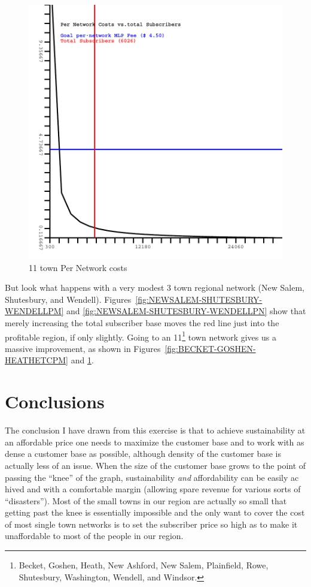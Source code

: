 \documentclass[12pt]{article}
\begin{document}
\begin{figure}[Hpbt]
\begin{centering}
\includegraphics[width=5in]{BECKET-GOSHEN-HEATH-NEW_ASHFORD-NEW_SALEM-PLAINFIELD-ROWE-SHUTESBURY-WASHINGTON-WENDELL-WINDSOR-PerNetwork.pdf}
\caption{11 town Per Network costs}
\label{fig:BECKET-GOSHEN-HEATHETCPN}
\end{centering}
\end{figure}

\clearpage

But look what happens with a very modest 3 town regional network (New Salem,
Shutesbury, and Wendell). Figures~\ref{fig:NEWSALEM-SHUTESBURY-WENDELLPM} and
\ref{fig:NEWSALEM-SHUTESBURY-WENDELLPN} show that merely increasing the total
subscriber base moves the red line just into the profitable region, if only
slightly. Going to an 11\footnote{Becket, Goshen, Heath, New Ashford, New
Salem, Plainfield, Rowe, Shutesbury, Washington, Wendell, and Windsor.} town
network gives us a massive improvement, as shown in
Figures~\ref{fig:BECKET-GOSHEN-HEATHETCPM} and
\ref{fig:BECKET-GOSHEN-HEATHETCPN}.

\section{Conclusions}

The conclusion I have drawn from this exercise is that to achieve sustainability
at an affordable price one needs to maximize the customer base and to work
with as dense a customer base as possible, although density of the customer
base is actually less of an issue. When the size of the customer base grows to
the point of passing the ``knee'' of the graph, sustainability \textit{and}
affordability can be easily ac hived and with a comfortable margin (allowing
spare revenue for various sorts of ``disasters''). Most of the small towns in
our region are actually so small that getting past the knee is essentially
impossible and the only want to cover the cost of most single town networks is
to set the subscriber price so high as to make it unaffordable to most of the
people in our region.
\end{document}
